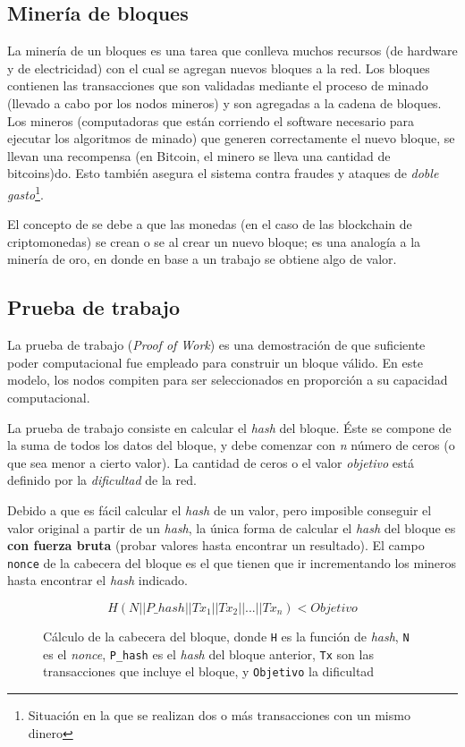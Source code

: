 \subsection{Minería de bloques}

La minería de un bloques es una tarea que conlleva muchos recursos (de hardware y de electricidad) con el cual se agregan nuevos bloques a la red. Los bloques contienen las transacciones que son validadas mediante el proceso de minado (llevado a cabo por los nodos mineros) y son agregadas a la cadena de bloques. Los mineros (computadoras que están corriendo el software necesario para ejecutar los algoritmos de minado) que generen correctamente el nuevo bloque, se llevan una recompensa (en Bitcoin, el minero se lleva una cantidad de bitcoins)do. Esto también asegura el sistema contra fraudes y ataques de \emph{doble gasto}\footnote{Situación en la que se realizan dos o más transacciones con un mismo dinero}.

El concepto de  se debe a que las monedas (en el caso de las blockchain de criptomonedas) se crean o se  al crear un nuevo bloque; es una analogía a la minería de oro, en donde en base a un trabajo se obtiene algo de valor.

\subsection{Prueba de trabajo}

La prueba de trabajo (\emph{Proof of Work}) es una demostración de que suficiente poder computacional fue empleado para construir un bloque válido. En este modelo, los nodos compiten para ser seleccionados en proporción a su capacidad computacional.

La prueba de trabajo consiste en calcular el \emph{hash} del bloque. Éste se compone de la suma de todos los datos del bloque, y debe comenzar con \emph{n} número de ceros (o que sea menor a cierto valor). La cantidad de ceros o el valor \emph{objetivo} está definido por la \emph{dificultad} de la red.     

Debido a que es fácil calcular el \emph{hash} de un valor, pero imposible conseguir el valor original a partir de un \emph{hash}, la única forma de calcular el \emph{hash} del bloque es \textbf{con fuerza bruta} (probar valores hasta encontrar un resultado). El campo \texttt{nonce} de la cabecera del bloque es el que tienen que ir incrementando los mineros hasta encontrar el \emph{hash} indicado.

\begin{figure}[H]
    \centering
    \[ H(N || P\_hash|| Tx_1 || Tx_2 || ... || Tx_n) < Objetivo \]
    \caption*{Cálculo de la cabecera del bloque, donde \texttt{H} es la función de \emph{hash}, \texttt{N} es el \emph{nonce}, \texttt{P\_hash} es el \emph{hash} del bloque anterior, \texttt{Tx} son las transacciones que incluye el bloque, y \texttt{Objetivo} la dificultad}
\end{figure}

